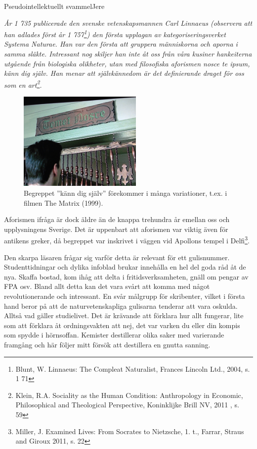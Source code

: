 \documentclass{spektraklet}
\begin{document}
\begin{artikel}{Pseudointellektuellt svammel}{Jere}

\textit{År 1 735 publicerade den svenske vetenskapsmannen Carl Linnaeus (observera att han adlades först år 1 757\footnote{Blunt, W. Linnaeus: The Compleat Naturalist, Frances Lincoln Ltd., 2004, s. 1 71}) den första upplagan av kategoriseringsverket Systema
Naturae. Han var den första att gruppera människorna och aporna i samma släkte. Intressant nog skiljer han inte åt oss från våra kusiner hankeiterna utgående från biologiska olikheter, utan med filosofiska aforismen nosce te ipsum, känn dig själv. Han menar att självkännedom är det definierande draget för oss som en art\footnote{Klein, R.A. Sociality as the Human Condition: Anthropology in Economic, Philosophical and Theological Perspective, Koninklijke Brill NV, 2011 , s. 59}.}


\begin{figure}
	\includegraphics[width=6cm]{bilder/matrix.jpeg}
	\caption*{Begreppet ”känn dig själv” förekommer i många variationer, t.ex. i filmen The Matrix (1999).}
\end{figure}

Aforismen ifråga är dock äldre än de knappa trehundra år emellan oss och upplysningens Sverige. Det är uppenbart att aforismen var viktig även för antikens greker, då begreppet var inskrivet i väggen vid Apollons tempel i Delfi\footnote{Miller, J. Examined Lives: From Socrates to Nietzsche, 1. t., Farrar, Straus and Giroux 2011, s. 22}.

Den skarpa läsaren frågar sig varför detta är relevant för ett gulisnummer. Studenttidningar och dylika infoblad brukar innehålla en hel del goda råd åt de nya. Skaffa bostad, kom ihåg att delta i fritidsverksamheten, gnäll om pengar av FPA osv. Bland allt detta kan det vara svårt att komma med något revolutionerande och intressant. En svår målgrupp för skribenter, vilket i första hand beror på att de naturvetenskapliga gulisarna tenderar att vara oskulda. Alltså vad gäller studielivet. Det är krävande att förklara hur allt fungerar, lite som att förklara åt ordningsvakten att nej, det var varken du eller din kompis som spydde i hörnsoffan. Kemister destillerar olika saker med varierande framgång och här följer mitt försök att destillera en gnutta sanning.


\end{artikel}
\end{document}
